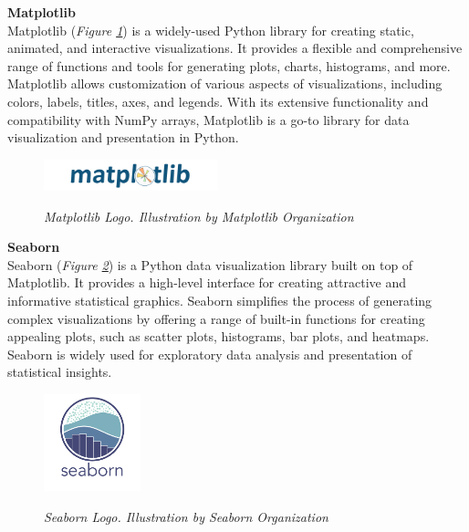 \vspace{0.5cm}
\textbf{Matplotlib} \\

Matplotlib (\textit{Figure \ref{fig:matplotlib-logo}}) is a widely-used Python library for creating static, animated, and interactive visualizations. It provides a flexible and comprehensive range of functions and tools for generating plots, charts, histograms, and more. Matplotlib allows customization of various aspects of visualizations, including colors, labels, titles, axes, and legends. With its extensive functionality and compatibility with NumPy arrays, Matplotlib is a go-to library for data visualization and presentation in Python.

\begin{figure}[H]
\centering
\includegraphics[width=0.45\textwidth]{imatges/studies_and_decisions/matplotlib-logo.png}
\caption[Matplotlib Logo]{\textit{Matplotlib Logo. Illustration by Matplotlib Organization}}
{\label{fig:matplotlib-logo}}
\end{figure}

\vspace{0.5cm}
\textbf{Seaborn} \\

Seaborn (\textit{Figure \ref{fig:seaborn-logo}}) is a Python data visualization library built on top of Matplotlib. It provides a high-level interface for creating attractive and informative statistical graphics. Seaborn simplifies the process of generating complex visualizations by offering a range of built-in functions for creating appealing plots, such as scatter plots, histograms, bar plots, and heatmaps. Seaborn is widely used for exploratory data analysis and presentation of statistical insights. 

\begin{figure}[H]
\centering
\includegraphics[width=0.25\textwidth]{imatges/studies_and_decisions/seaborn-logo.png}
\caption[Seaborn Logo]{\textit{Seaborn Logo. Illustration by Seaborn Organization}}
{\label{fig:seaborn-logo}}
\end{figure}

